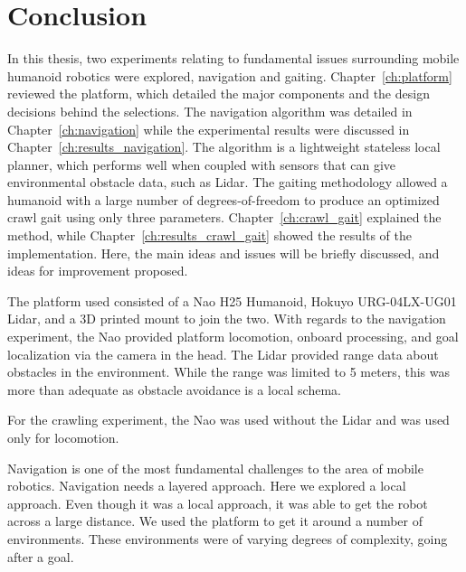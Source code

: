 \chapter{Conclusion} \label{ch:conclusion}
In this thesis, two experiments relating to fundamental issues surrounding
mobile humanoid robotics were explored, navigation and gaiting.
Chapter~\ref{ch:platform} reviewed the platform, which detailed the major 
components and the design decisions behind the selections.
The navigation algorithm was detailed in Chapter~\ref{ch:navigation} while the
experimental results were discussed in Chapter~\ref{ch:results_navigation}.
The algorithm is a lightweight stateless local planner, which performs well when
coupled with sensors that can give environmental obstacle data, such as Lidar.
The gaiting methodology allowed a humanoid with a large number of
degrees-of-freedom to produce an optimized crawl gait using only three
parameters. Chapter~\ref{ch:crawl_gait} explained the method, while
Chapter~\ref{ch:results_crawl_gait} showed the results of the implementation.
Here, the main ideas and issues will be briefly discussed, and ideas for
improvement proposed.

The platform used consisted of a Nao H25 Humanoid, Hokuyo URG-04LX-UG01 Lidar, 
and a 3D printed mount to join the two. With regards to the navigation 
experiment, the Nao provided platform locomotion, onboard processing, and goal 
localization via the camera in the head. The Lidar provided range data about
obstacles in the environment. While the range was limited to 5 meters, this
was more than adequate as obstacle avoidance is a local schema.

For the crawling experiment, the Nao was used
without the Lidar and was used only for locomotion.

Navigation is one of the most fundamental challenges to the area of mobile 
robotics. Navigation needs a layered approach. Here we explored a local
approach. Even though it was a local approach, it was able to get the robot
across a large distance.
We used the platform to get it around a number of environments.
These environments were of varying degrees of complexity, going after a goal.

